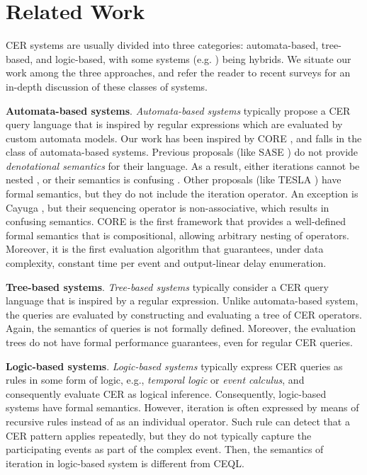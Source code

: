 \chapter{Related Work}\label{chapter:related_work}

CER systems are usually divided into three categories:  automata-based, tree-based, and logic-based, with some systems (e.g. \cite{esper, tesla}) being hybrids. We situate our work among the three approaches, and refer the reader to recent surveys \cite{survey-systems-1,survey-systems-2,research-evaluation-query} for an in-depth discussion of these classes of systems.

\textbf{Automata-based systems}. \emph{Automata-based systems} typically propose a CER query language that is inspired by regular expressions which are evaluated by custom automata models. Our work has been inspired by CORE \cite{core}, and falls in the class of automata-based systems. Previous proposals (like SASE \cite{sase}) do not provide \emph{denotational semantics} for their language. As a result, either iterations cannot be nested \cite{skip-till-any-match}, or their semantics is confusing \cite{next-cep}. Other proposals (like TESLA \cite{tesla}) have formal semantics, but they do not include the iteration operator. An exception is Cayuga \cite{cayuga},  but their sequencing operator is non-associative, which results in confusing semantics. CORE \cite{core} is the first framework that provides a well-defined formal semantics that is compositional, allowing arbitrary nesting of operators. Moreover, it is the first evaluation algorithm that guarantees, under data complexity, constant time per event and output-linear delay enumeration.

\textbf{Tree-based systems}. \emph{Tree-based systems} \cite{esper, tree-based-system-1, tree-based-system-2} typically consider a CER query language that is inspired by a regular expression. Unlike automata-based system, the queries are evaluated by constructing and evaluating a tree of CER operators. Again, the semantics of queries is not formally defined. Moreover, the evaluation trees do not have formal performance guarantees, even for regular CER queries.

\textbf{Logic-based systems}. \emph{Logic-based systems} \cite{logic-based-system-1, logic-based-system-2, logic-based-system-3} typically express CER queries as rules in some form of logic, e.g., \emph{temporal logic} or \emph{event calculus}, and consequently evaluate CER as logical inference. Consequently, logic-based systems have formal semantics. However, iteration is often expressed by means of recursive rules instead of as an individual operator. Such rule can detect that a CER pattern applies repeatedly, but they do not typically capture the participating events as part of the complex event. Then, the semantics of iteration in logic-based system is different from CEQL.

